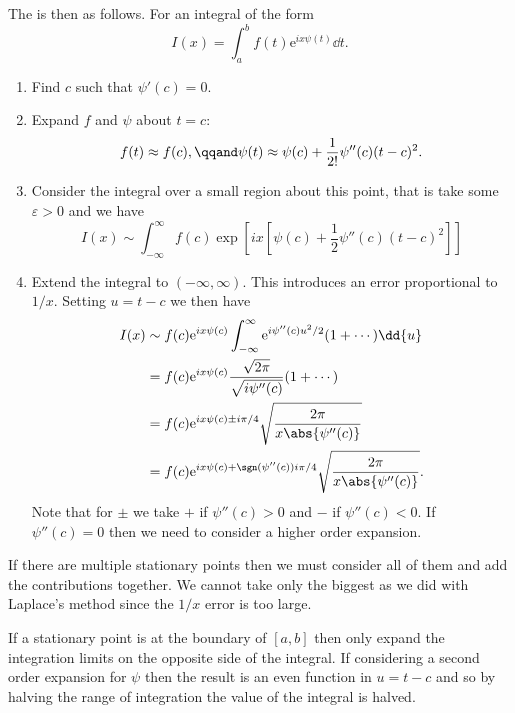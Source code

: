\documentclass[fleqn]{NotesClass}
\newcommand*{\e}{\mathrm{e}}
\begin{document}
    The  is then as follows.
    For an integral of the form
    \begin{equation}
        I(x) = \int_a^b f(t)\e^{ix\psi(t)} \dd{t}.
    \end{equation}
    \begin{enumerate}
        \item Find \(c\) such that \(\psi'(c) = 0\).
        \item Expand \(f\) and \(\psi\) about \(t = c\):
        \begin{equation}
            f(t) \approx f(c), \qqand \psi(t) \approx \psi(c) + \frac{1}{2!}\psi''(c)(t - c)^2.
        \end{equation}
        \item Consider the integral over a small region about this point, that is take some \(\varepsilon > 0\) and we have
        \begin{equation}
            I(x) \sim \int_{-\infty}^{\infty} f(c)\exp\left[ ix\left[ \psi(c) + \frac{1}{2}\psi''(c)(t - c)^2 \right] \right]
        \end{equation}
        \item Extend the integral to \((-\infty, \infty)\).
        This introduces an error proportional to \(1/x\).
        Setting \(u = t - c\) we then have
        \begin{align}
            I(x) &\sim f(c) \e^{ix\psi(c)} \int_{-\infty}^{\infty} \e^{i\psi''(c)u^2/2}(1 + \dotsb) \dd{u}\\
            &= f(c)\e^{ix\psi(c)} \frac{\sqrt{2\pi}}{\sqrt{i\psi''(c)}}(1 + \dotsb)\\
            &= f(c) \e^{ix\psi(c) \pm i\pi/4} \sqrt{\frac{2\pi}{x\abs{\psi''(c)}}}\\
            &= f(c) \e^{ix\psi(c) + \sgn(\psi''(c))i\pi/4}\sqrt{\frac{2\pi}{x\abs{\psi''(c)}}}.
        \end{align}
        Note that for \(\pm\) we take \(+\) if \(\psi''(c) > 0\) and \(-\) if \(\psi''(c) < 0\).
        If \(\psi''(c) = 0\) then we need to consider a higher order expansion.
    \end{enumerate}
    
    If there are multiple stationary points then we must consider all of them and add the contributions together.
    We cannot take only the biggest as we did with Laplace's method since the \(1/x\) error is too large.
    
    If a stationary point is at the boundary of \([a, b]\) then only expand the integration limits on the opposite side of the integral.
    If considering a second order expansion for \(\psi\) then the result is an even function in \(u = t - c\) and so by halving the range of integration the value of the integral is halved.
    
\end{document}
